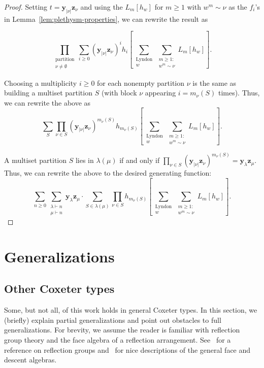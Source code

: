 \documentclass[ALCO, Unicode]{cedram}
\begin{document}
\begin{proof}
Setting $t = \mathbf{y}_{|\nu|}\mathbf{z}_\nu$ and using the $L_m[h_w]$ for $m \geq 1$ with $w^m \sim \nu$ as the $f_i$'s in Lemma~\ref{lem:plethysm-properties}, we can rewrite the result as 

\[\prod_{\substack{\text{partition}\\ \nu \neq \emptyset}} \sum_{i \geq 0}(\mathbf{y}_{|\nu|}\mathbf{z}_\nu)^i h_i \left[ \sum_{\substack{\text{Lyndon}\\w}}\sum_{\substack{m \geq 1:\\ w^{m} \sim \nu}}L_{m}[h_w]\right].\]

Choosing a multiplicity $i \geq 0$ for each nonempty partition $\nu$ is the same as building a multiset partition $S$ (with block $\nu$ appearing $i = m_\nu(S)$ times).
{Thus, we can rewrite the above as} 
\[\sum_S \prod_{\nu \in S} (\mathbf{y}_{|\nu|}\mathbf{z}_\nu)^{m_\nu(S)} h_{m_\nu(S)} \left[ \sum_{\substack{\text{Lyndon}\\w}}\sum_{\substack{m \geq 1:\\ w^{m} \sim \nu}}L_{m}[h_w]\right].\]

A multiset partition $S$ lies in $\lambda(\mu)$ if and only if $\prod_{\nu \in S}\left(\mathbf{y}_{|\nu|}\mathbf{z}_\nu\right)^{m_\nu(S)} = \mathbf{y}_\lambda \mathbf{z}_\mu.$ Thus, we can rewrite the above to the desired generating function:
\[\sum_{n \geq 0} \sum_{\substack{\lambda \vdash n\\ \mu \vdash n}} \mathbf{y}_\lambda \mathbf{z}_\mu \cdot \sum_{S \in \lambda(\mu)}  \prod_{\nu \in S}  h_{m_\nu(S)} \left[ \sum_{\substack{\text{Lyndon}\\w}}\sum_{\substack{m \geq 1:\\ w^{m} \sim \nu}}L_{m}[h_w]\right].\]
\end{proof}

\section{Generalizations} \label{sec:generalizations}
\subsection{Other Coxeter types}
Some, but not all, of this work holds in general Coxeter types. In this section, we (briefly) explain partial generalizations and point out obstacles to full generalizations. For brevity, we assume the reader is familiar with reflection group theory and the face algebra of a reflection arrangement. See~\cite{kane} for a reference on reflection groups and~\cite{Aguiar-Mahajan, saliolaquiverdescalgebra, saliolafacealgebra} for nice descriptions of the general face and descent algebras.
\end{document}
